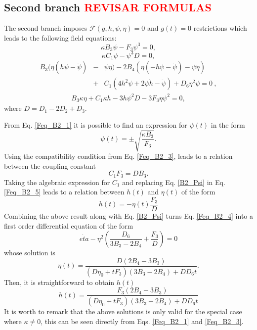 \subsection{Second branch \textcolor{red}{REVISAR FORMULAS}}

The second branch imposes $\mathcal{F}(g,h,\psi,\eta)  = 0$ and $g(t) = 0$ restrictions which leads to the following field equations:
\begin{dmath}
    \label{Feq_B2_1}
    \kappa B_3 \psi - F_3\psi^3= 0,
\end{dmath}
\begin{dmath}
    \label{Feq_B2_3}
    \kappa C_1\psi - \psi^3 D = 0 ,
\end{dmath}
\begin{eqnarray}
    \label{Feq_B2_4}
    B_3(\eta(h\psi -\dot{\psi}) &-&\psi\dot{\eta}) - 2B_4(\eta(-h\psi - \dot{\psi}) - \psi\dot{\eta})   \\ &+& C_1(4h^2\psi + 2\psi\dot{h} -\ddot{\psi}) + D_6\eta^2\psi = 0 \ ,\nonumber 
\end{eqnarray}
\begin{eqnarray}
    \label{Feq_B2_5}
    B_3\kappa\eta + C_1\kappa h - 3h\psi^2 D - 3F_3\eta\psi^2 = 0,
\end{eqnarray}
where $D = D_1 - 2D_2 + D_3$.

From Eq. \eqref{Feq_B2_1} it is possible to find an expression for $\psi(t)$ in the form
\begin{equation}
	\label{B2_Psi}
    \psi(t) = \pm \sqrt{\frac{\kappa B_3}{F_3}} .
\end{equation}
Using the compatibility condition from Eq. \eqref{Feq_B2_3}, leads to a relation between
the coupling constant
\begin{equation}
 C_1 F_3 = D B_3.
\end{equation}
Taking the algebraic expression for $C_1$ and replacing Eq. \eqref{B2_Psi} in Eq.\eqref{Feq_B2_5} leads to a relation between $h(t)$ and $\eta(t)$ of the form
\begin{equation}
    h(t) = - \eta(t)\frac{F_3}{D}
\end{equation}
Combining the above result along with Eq. \eqref{B2_Psi} turns Eq. \eqref{Feq_B2_4} into a first order differential equation of the form
\begin{equation}
 \dot{eta} - \eta^2\left(\frac{D_6}{3B_3 - 2B_4} + \frac{F_3}{D}\right) = 0
\end{equation}
whose solution is
\begin{equation}
    \eta(t) = \frac{D\left(2B_4 - 3B_3\right)}{\left(D \eta_0 + tF_3\right)\left(3B_3 - 2B_4\right) + DD_6 t}.
\end{equation}
Then, it is straightforward to obtain $h(t)$ 
\begin{equation}
    h(t) = \frac{F_3\left(2B_4 - 3B_3\right)}{\left(D \eta_0 + tF_3\right)\left(3B_3 - 2B_4\right) + DD_6 t}
\end{equation}
It is worth to remark that the above solutions is only valid for the special case 
where $\kappa \neq 0$, this can be seen directly from Eqs. \eqref{Feq_B2_1} and \eqref{Feq_B2_3}.

